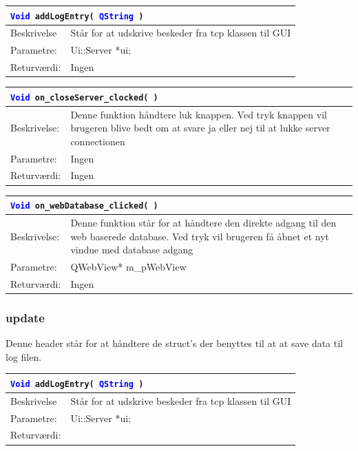\begin{table}[H]
\begin{tabular}{l p{12.5cm}}
\multicolumn{2}{l}{\texttt{\textcolor{blue}{Void} addLogEntry( \textcolor{blue}{QString} )}} \\
\hline
Beskrivelse & Står for at udskrive beskeder fra tcp klassen til GUI \\
Parametre: & Ui::Server *ui;\\
Returværdi:& Ingen\\
\end{tabular}
\end{table}

\begin{table}[H]
\begin{tabular}{l p{12.5cm}}
\multicolumn{2}{l}{\texttt{\textcolor{blue}{Void} on\_closeServer\_clocked( )}} \\
\hline
Beskrivelse: &Denne funktion håndtere luk knappen. Ved tryk knappen vil brugeren blive bedt om at svare ja eller nej til at lukke server connectionen \\
Parametre: & Ingen\\
Returværdi: & Ingen\\
\end{tabular}
\end{table}

\begin{table}[H]
\begin{tabular}{l p{12.5cm}}
\multicolumn{2}{l}{\texttt{\textcolor{blue}{Void} on\_webDatabase\_clicked( )}} \\
\hline
Beskrivelse: & Denne funktion står for at håndtere den direkte adgang til den web baserede database. Ved tryk vil brugeren få åbnet et nyt vindue med database adgang \\
Parametre: & QWebView* m\_pWebView\\
Returværdi: & Ingen\\
\end{tabular}
\end{table}

\subsubsection{update}
Denne header står for at håndtere de struct's der benyttes til at at save data til log filen. 

\begin{table}[H]
\begin{tabular}{l p{12.5cm}}
\multicolumn{2}{l}{\texttt{\textcolor{blue}{Void} addLogEntry( \textcolor{blue}{QString} )}} \\
\hline
Beskrivelse&Står for at udskrive beskeder fra tcp klassen til GUI \\
Parametre:& Ui::Server *ui;\\
Returværdi:&\\
\end{tabular}
\end{table}


